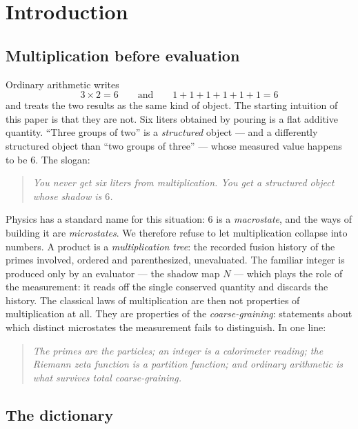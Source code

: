 \documentclass[11pt]{article}
\numberwithin{equation}{section}
\theoremstyle{plain}
\theoremstyle{definition}
\theoremstyle{remark}
\begin{document}
\tableofcontents

\section{Introduction}

\subsection{Multiplication before evaluation}

Ordinary arithmetic writes
\[
3 \times 2 = 6
\qquad\text{and}\qquad
1+1+1+1+1+1 = 6
\]
and treats the two results as the same kind of object. The starting intuition of this
paper is that they are not. Six liters obtained by pouring is a flat additive quantity.
``Three groups of two'' is a \emph{structured} object --- and a differently structured
object than ``two groups of three'' --- whose measured value happens to be $6$. The
slogan:

\begin{quote}
\emph{You never get six liters from multiplication. You get a structured object whose
shadow is $6$.}
\end{quote}

Physics has a standard name for this situation: $6$ is a \emph{macrostate}, and the
ways of building it are \emph{microstates}. We therefore refuse to let multiplication
collapse into numbers. A product is a \emph{multiplication tree}: the recorded fusion
history of the primes involved, ordered and parenthesized, unevaluated. The familiar
integer is produced only by an evaluator --- the shadow map $N$ --- which plays the
role of the measurement: it reads off the single conserved quantity and discards the
history. The classical laws of multiplication are then not properties of
multiplication at all. They are properties of the \emph{coarse-graining}: statements
about which distinct microstates the measurement fails to distinguish. In one line:

\begin{quote}
\emph{The primes are the particles; an integer is a calorimeter reading; the Riemann
zeta function is a partition function; and ordinary arithmetic is what survives total
coarse-graining.}
\end{quote}

\subsection{The dictionary}\label{sec:dictionary}
\end{document}
